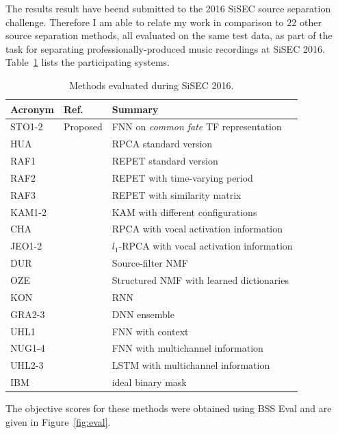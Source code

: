 {{The results result have beend submitted to the 2016 SiSEC source separation challenge.
Therefore I am able to relate my work in comparison to $22$ other source separation methods, all evaluated on the same test data, as part of the task for separating professionally-produced music recordings at SiSEC 2016.
Table~\ref{tab:sisec_systems} lists the participating systems.
\begin{table}[htbp]
	\centering
	\caption{Methods evaluated during SiSEC 2016.}
	\label{tab:sisec_systems}
	\begin{tabular}{lll@{}}
		\hline
		\textbf{Acronym} & \textbf{Ref.} & \textbf{Summary}\\
		\hline
    STO1-2 & Proposed & FNN on \textit{common fate} TF representation \\
		HUA & \cite{huang12} & RPCA standard version \\
		RAF1 & \cite{rafii13} & REPET standard version \\
		RAF2 & \cite{liutkus12} & REPET with time-varying period \\
		RAF3 & \cite{rafii12} & REPET with similarity matrix \\
		KAM1-2 & \cite{liutkus15} & KAM with different configurations \\
		CHA & \cite{chan15} & RPCA with vocal activation information \\
		JEO1-2 & \cite{jeong17} &  $l_1$-RPCA with vocal activation information \\
		DUR & \cite{durrieu11} & Source-filter NMF \\
		OZE & \cite{salaun14} & Structured NMF with learned dictionaries \\
		KON & \cite{huang15} & RNN \\
		GRA2-3 & \cite{grais16} & DNN ensemble \\
		UHL1 & \cite{uhlich15} & FNN with context \\
		NUG1-4 & \cite{nugraha16} & FNN with multichannel information \\
		UHL2-3 & \cite{uhlich17} & LSTM with multichannel information \\
		IBM & & ideal binary mask \\
	\end{tabular}
\end{table}

The objective scores for these methods were obtained using BSS Eval and are given in Figure~\ref{fig:eval}.

}}
